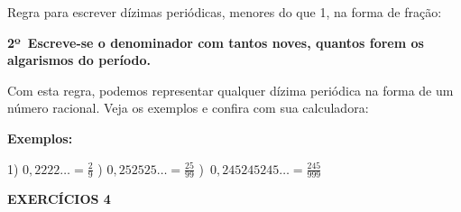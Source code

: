 \documentclass[12pt]{article}
\renewcommand{\_}{\kern-1.5pt\textunderscore\kern-1.5pt}
\begin{document}
\vspace{\baselineskip}
\tab Regra para escrever dízimas periódicas, menores do que 1, na forma de fração:\par

\par 
\begin{adjustwidth}{0.49in}{0.0in}
\begin{justify}
\textbf{2º\   Escreve-se o denominador com tantos noves, quantos forem os algarismos do período.}
\end{justify}\par

\end{adjustwidth}


\vspace{\baselineskip}
\tab Com esta regra, podemos representar qualquer dízima periódica na forma de um número racional. Veja os exemplos e confira com sua calculadora:\par

\textbf{Exemplos:}\par

1)  \( 0,2222 \ldots =\frac{2}{9} \)  \tab {})  \( 0,252525 \ldots =\frac{25}{99} \) \tab {})\   \( 0,245245245 \ldots =\frac{245}{999} \) \par

\begin{adjustwidth}{0.25in}{0.0in}
\textbf{EXERCÍCIOS 4}\par

\end{adjustwidth}
\end{document}
